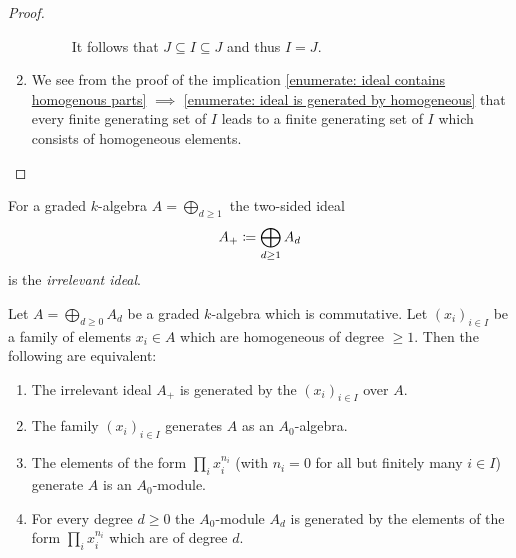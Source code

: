\begin{proof}
\begin{enumerate}
\begin{description}
          It follows that $J \subseteq I \subseteq J$ and thus $I = J$.
      \end{description}
    \item
      We see from the proof of the implication \ref*{enumerate: ideal contains homogenous parts} $\implies$ \ref*{enumerate: ideal is generated by homogeneous} that every finite generating set of $I$ leads to a finite generating set of $I$ which consists of homogeneous elements.
    \qedhere
  \end{enumerate}
\end{proof}


\begin{definition}
  For a graded $k$-algebra $A = \bigoplus_{d \geq 1}$ the two-sided ideal
  \[
              A_+
    \coloneqq  \bigoplus_{d \geq 1} A_d
  \]
  is the \emph{irrelevant ideal}.
\end{definition}


\begin{proposition}
  \label{proposition: homeneous generators for irrelevant ideal}
  Let $A = \bigoplus_{d \geq 0} A_d$ be a graded $k$-algebra which is commutative.
  Let $(x_i)_{i \in I}$ be a family of elements $x_i \in A$ which are homogeneous of degree $\geq 1$.
  Then the following are equivalent:
  \begin{enumerate}
    \item
      The irrelevant ideal $A_+$ is generated by the $(x_i)_{i \in I}$ over $A$.
    \item
      The family $(x_i)_{i \in I}$ generates $A$ as an $A_0$-algebra.
    \item
      The elements of the form $\prod_i x_i^{n_i}$ (with $n_i = 0$ for all but finitely many $i \in I$) generate $A$ is an $A_0$-module.
    \item
      For every degree $d \geq 0$ the $A_0$-module $A_d$ is generated by the elements of the form $\prod_i x_i^{n_i}$ which are of degree $d$.
  \end{enumerate}
\end{proposition}


